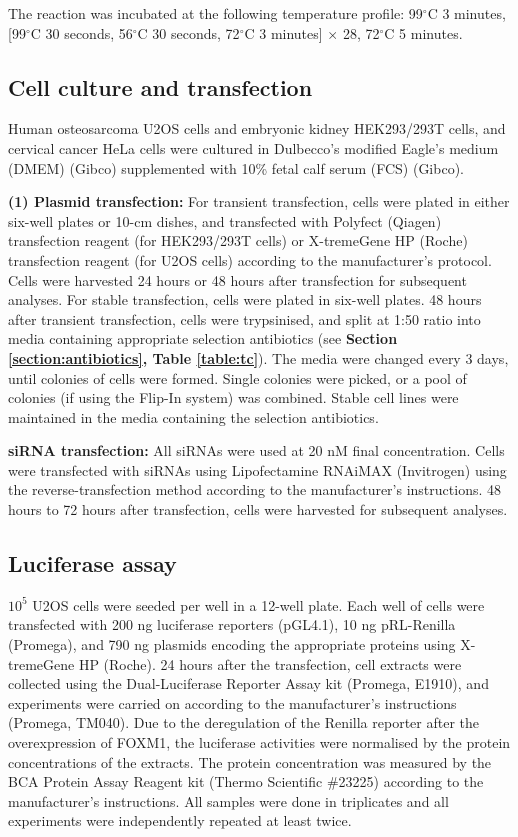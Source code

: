 The reaction was incubated at the following temperature profile: 99$^\circ$C 3 minutes, [99$^\circ$C 30 seconds, 56$^\circ$C 30 seconds, 72$^\circ$C 3 minutes] $\times$ 28, 72$^\circ$C 5 minutes.

\subsection{Cell culture and transfection}

Human osteosarcoma U2OS cells and embryonic kidney HEK293/293T cells, and cervical cancer HeLa cells were cultured in Dulbecco’s modified Eagle’s medium (DMEM) (Gibco) supplemented with 10\% fetal calf serum (FCS) (Gibco).

\textbf{(1) Plasmid transfection:} For transient transfection, cells were plated in either six-well plates or 10-cm dishes, and transfected with Polyfect (Qiagen) transfection reagent (for HEK293/293T cells) or X-tremeGene HP (Roche) transfection reagent (for U2OS cells) according to the manufacturer's protocol. Cells were harvested 24 hours or 48 hours after transfection for subsequent analyses. For stable transfection, cells were plated in six-well plates. 48 hours after transient transfection, cells were trypsinised, and split at 1:50 ratio into media containing appropriate selection antibiotics (see \textbf{Section \ref{section:antibiotics}, Table \ref{table:tc}}). The media were changed every 3 days, until colonies of cells were formed. Single colonies were picked, or a pool of colonies (if using the Flip-In system) was combined. Stable cell lines were maintained in the media containing the selection antibiotics.

\textbf{siRNA transfection:} All siRNAs were used at 20 nM final concentration. Cells were transfected with siRNAs using Lipofectamine RNAiMAX (Invitrogen) using the reverse-transfection method according to the manufacturer's instructions. 48 hours to 72 hours after transfection, cells were harvested for subsequent analyses.

\subsection{Luciferase assay}

$10^5$ U2OS cells were seeded per well in a 12-well plate. Each well of cells were transfected with 200 ng luciferase reporters (pGL4.1), 10 ng pRL-Renilla (Promega), and 790 ng plasmids encoding the appropriate proteins using X-tremeGene HP (Roche). 24 hours after the transfection, cell extracts were collected using the Dual-Luciferase Reporter Assay kit (Promega, E1910), and experiments were carried on according to the manufacturer's instructions (Promega, TM040). Due to the deregulation of the Renilla reporter after the overexpression of FOXM1, the luciferase activities were normalised by the protein concentrations of the extracts. The protein concentration was measured by the BCA Protein Assay Reagent kit (Thermo Scientific \#23225) according to the manufacturer’s instructions. All samples were done in triplicates and all experiments were independently repeated at least twice.

